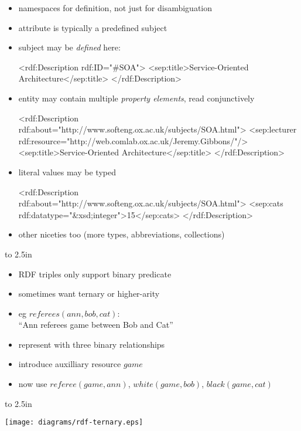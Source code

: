 \documentclass{sepslide-soa-faked} %
\begin{document}
\begin{slide}
\begin{itemize}
\item namespaces for definition, not just for disambiguation
\item {} attribute is typically a predefined subject
\item subject may be \emph{defined} here:
\begin{xml}
<rdf:Description rdf:ID="#SOA">
  <sep:title>Service-Oriented Architecture</sep:title>
</rdf:Description>
\end{xml}
\end{itemize}
\end{slide}
\begin{slide}
\begin{itemize}
\item {} entity may contain multiple \emph{property elements}, read conjunctively
\begin{xml}
<rdf:Description 
  rdf:about="http://www.softeng.ox.ac.uk/subjects/SOA.html">
  <sep:lecturer 
    rdf:resource="http://web.comlab.ox.ac.uk/Jeremy.Gibbons/"/>
  <sep:title>Service-Oriented Architecture</sep:title>
</rdf:Description>
\end{xml}
\item literal values may be typed
\begin{xml}
<rdf:Description 
  rdf:about="http://www.softeng.ox.ac.uk/subjects/SOA.html">
  <sep:cats rdf:datatype="&xsd;integer">15</sep:cats>
</rdf:Description>
\end{xml}
\item other niceties too (more types, abbreviations, collections)
\end{itemize}
\end{slide}

\begin{slide}
\begin{minipage}{0.5\textwidth}\raggedright
\vbox to 2.5in{
\begin{itemize}
\item RDF triples only support binary predicate
\item sometimes want ternary or higher-arity
\item eg $referees(ann,bob,cat)$: \\ ``Ann referees game between Bob and Cat''
\item represent with three binary relationships
\item introduce auxilliary resource $game$
\item now use $referee(game,ann)$, $white(game,bob)$, $black(game,cat)$
\end{itemize}
\vfil}
\end{minipage}
\hfil
\begin{minipage}{0.45\textwidth}
\vbox to 2.5in{
\begin{flushright}%
\texttt{[image: diagrams/rdf-ternary.eps]}
\end{flushright}
\vfil}
\end{minipage}%
\end{slide}
\end{document}
